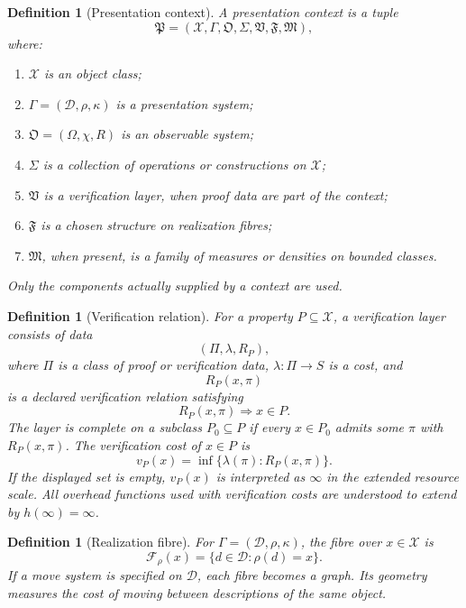 \documentclass[11pt]{article}
\newtheorem{definition}[theorem]{Definition}
\begin{document}
\begin{definition}[Presentation context]
A presentation context is a tuple
\[
\mathfrak P=(\mathcal X,\Gamma,\mathfrak O,\Sigma,\mathfrak V,\mathfrak F,\mathfrak M),
\]
where:
\begin{enumerate}[label=(\roman*)]
\item \(\mathcal X\) is an object class;
\item \(\Gamma=(\mathcal D,\rho,\kappa)\) is a presentation system;
\item \(\mathfrak O=(\Omega,\chi,R)\) is an observable system;
\item \(\Sigma\) is a collection of operations or constructions on \(\mathcal X\);
\item \(\mathfrak V\) is a verification layer, when proof data are part of the context;
\item \(\mathfrak F\) is a chosen structure on realization fibres;
\item \(\mathfrak M\), when present, is a family of measures or densities on bounded classes.
\end{enumerate}
Only the components actually supplied by a context are used.
\end{definition}

\begin{definition}[Verification relation]
For a property \(P\subseteq\mathcal X\), a verification layer consists of data
\[
(\Pi,\lambda,R_P),
\]
where \(\Pi\) is a class of proof or verification data, \(\lambda:\Pi\to S\) is a cost, and
\[
R_P(x,\pi)
\]
is a declared verification relation satisfying
\[
R_P(x,\pi)\Longrightarrow x\in P.
\]
The layer is complete on a subclass \(P_0\subseteq P\) if every \(x\in P_0\) admits some \(\pi\) with \(R_P(x,\pi)\). The verification cost of \(x\in P\) is
\[
v_P(x)=\inf\{\lambda(\pi):R_P(x,\pi)\}.
\]
If the displayed set is empty, \(v_P(x)\) is interpreted as \(\infty\) in the extended resource scale. All overhead functions used with verification costs are understood to extend by \(h(\infty)=\infty\).
\end{definition}

\begin{definition}[Realization fibre]
For \(\Gamma=(\mathcal D,\rho,\kappa)\), the fibre over \(x\in\mathcal X\) is
\[
\mathcal F_\rho(x)=\{d\in\mathcal D:\rho(d)=x\}.
\]
If a move system is specified on \(\mathcal D\), each fibre becomes a graph. Its geometry measures the cost of moving between descriptions of the same object.
\end{definition}
\end{document}
